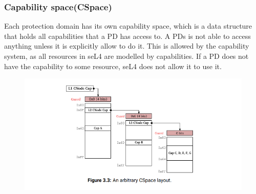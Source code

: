 \subsubsection{Capability space(CSpace)}
Each protection domain has its own capability space, which is a data structure that holds all capabilities that a PD has access to.
A PDs is not able to access anything unless it is explicitly allow to do it. This is allowed by the capability system, as all resources in seL4 are modelled by capabilities. 
If a PD does not have the capability to some resource, seL4 does not allow it to use it.

\begin{figure}
    \includegraphics[scale=0.5]{./figures/seL4_cap_space_addresssing.png}
    \label{asdfasd}
\end{figure}


